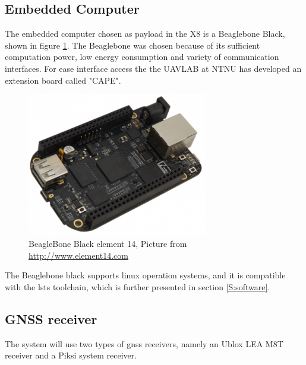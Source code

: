 \subsection{Embedded Computer}
The embedded computer chosen as payload in the X8 is a Beaglebone Black, shown in figure \ref{figure:BeagleBone}. The Beaglebone was chosen because of its sufficient computation power, low energy consumption and variety of communication interfaces. For ease interface access the  the UAVLAB at NTNU has developed an extension board called "CAPE".
\begin{figure}[H]
	\centering
		\includegraphics[width=0.7\textwidth]{figs/BeagleBoneBlackE14.png}
		\caption{BeagleBone Black element 14, Picture from \url{http://www.element14.com}}
		\label{figure:BeagleBone}
\end{figure}
The Beaglebone black supports linux operation systems, and it is compatible with the \gls{lsts} toolchain, which is further presented in section \ref{S:software}.
\subsection{GNSS receiver}
The system will use two types of \gls{gnss} receivers, namely an Ublox LEA M8T receiver and a Piksi system receiver. 

